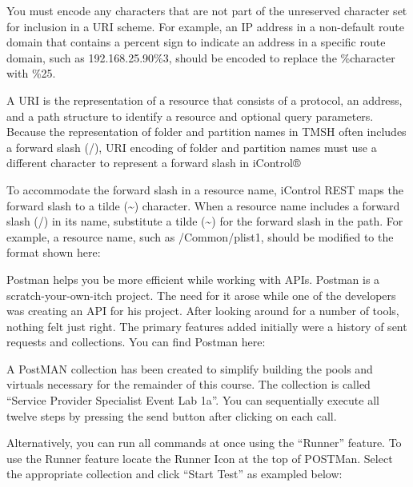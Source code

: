 \documentclass[letterpaper,10pt,english]{sphinxmanual}
\begin{document}
You must encode any characters that are not part of the unreserved
character set for inclusion in a URI scheme. For example, an IP address
in a non-default route domain that contains a percent sign to indicate
an address in a specific route domain, such as 192.168.25.90\%3, should
be encoded to replace the \%character with \%25.


A URI is the representation of a resource that consists of a protocol,
an address, and a path structure to identify a resource and optional
query parameters. Because the representation of folder and partition
names in TMSH often includes a forward slash (/), URI encoding of folder
and partition names must use a different character to represent a
forward slash in iControl®

To accommodate the forward slash in a resource name, iControl REST maps
the forward slash to a tilde (\textasciitilde{}) character. When a resource name
includes a forward slash (/) in its name, substitute a tilde (\textasciitilde{}) for the
forward slash in the path. For example, a resource name, such as
/Common/plist1, should be modified to the format shown here:



Postman helps you be more efficient while working with APIs. Postman is
a scratch-your-own-itch project. The need for it arose while one of the
developers was creating an API for his project. After looking around for
a number of tools, nothing felt just right. The primary features added
initially were a history of sent requests and collections. You can find
Postman here: 

A PostMAN collection has been created to simplify building the pools and
virtuals necessary for the remainder of this course. The collection is
called “Service Provider Specialist Event \textendash{} Lab 1a”. You can
sequentially execute all twelve steps by pressing the send button after
clicking on each call.


Alternatively, you can run all commands at once using the “Runner”
feature. To use the Runner feature locate the Runner Icon at the top of
POSTMan. Select the appropriate collection and click “Start Test” as
exampled below:
\end{document}

